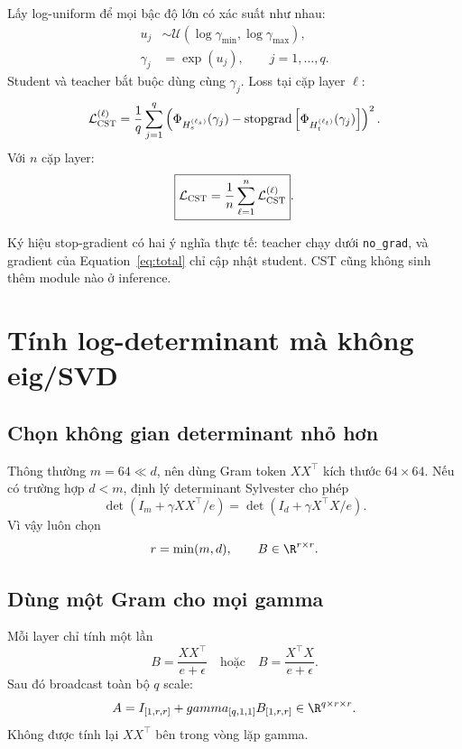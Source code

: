 \documentclass{article}
\newcommand{\cst}{\textsc{CST}}
\newcommand{\sg}{\operatorname{stopgrad}}
\begin{document}
Lấy log-uniform để mọi bậc độ lớn có xác suất như nhau:
\begin{align}
 u_j&\sim\mathcal U(\log\gamma_{\min},\log\gamma_{\max}),\\
 \gamma_j&=\exp(u_j),\qquad j=1,\ldots,q.
 \label{eq:gamma}
\end{align}
Student và teacher bắt buộc dùng cùng $\gamma_j$.  Loss tại cặp layer $\ell$:
\begin{equation}
 \mathcal L_{\cst}^{(\ell)}
 =\frac1q\sum_{j=1}^{q}
 \left(
  \Phi_{H_s^{(\ell_s)}}(\gamma_j)
  -\sg\left[\Phi_{H_t^{(\ell_t)}}(\gamma_j)\right]
 \right)^2.
 \label{eq:layerloss}
\end{equation}
Với $n$ cặp layer:
\begin{equation}
 \boxed{
 \mathcal L_{\cst}=\frac1n\sum_{\ell=1}^{n}
 \mathcal L_{\cst}^{(\ell)}}.
 \label{eq:multilayer}
\end{equation}

Ký hiệu stop-gradient có hai ý nghĩa thực tế: teacher chạy dưới
\texttt{no\_grad}, và gradient của Equation~\ref{eq:total} chỉ cập nhật
student.  CST cũng không sinh thêm module nào ở inference.

\section{Tính log-determinant mà không eig/SVD}

\subsection{Chọn không gian determinant nhỏ hơn}

Thông thường $m=64\ll d$, nên dùng Gram token $XX^\top$ kích thước $64\times64$.
Nếu có trường hợp $d<m$, định lý determinant Sylvester cho phép
\begin{equation}
 \det(I_m+\gamma XX^\top/e)
 =\det(I_d+\gamma X^\top X/e).
 \label{eq:sylvester}
\end{equation}
Vì vậy luôn chọn
\begin{equation}
 r=\min(m,d),\qquad B\in\R^{r\times r}.
\end{equation}

\subsection{Dùng một Gram cho mọi gamma}

Mỗi layer chỉ tính một lần
\begin{equation}
 B=\frac{XX^\top}{e+\epsilon}
 \quad\text{hoặc}\quad
 B=\frac{X^\top X}{e+\epsilon}.
\end{equation}
Sau đó broadcast toàn bộ $q$ scale:
\begin{equation}
 A=I_{[1,r,r]}+gamma_{[q,1,1]}B_{[1,r,r]}
 \in\R^{q\times r\times r}.
 \label{eq:batchA}
\end{equation}
Không được tính lại $X X^\top$ bên trong vòng lặp gamma.
\end{document}
